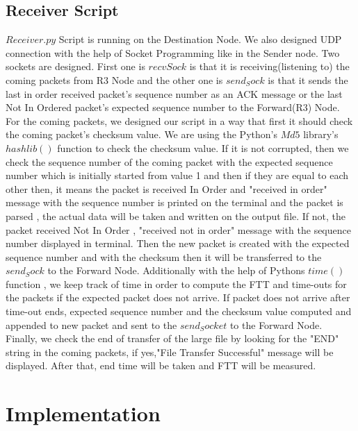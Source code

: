 \documentclass[conference]{IEEEtran}
\begin{document}
\subsection{Receiver Script}\label{CC}
$Receiver.py$ Script is running on the Destination Node. We also designed UDP connection with the help of Socket Programming like in the Sender node. Two sockets are designed. First one is $recvSock$ is that it is receiving(listening to) the coming packets from R3 Node and the other one is $send_Sock$ is that it sends the last in order received packet's sequence number as an ACK message or the last Not In Ordered packet's expected sequence number to the Forward(R3) Node. For the coming packets, we designed our script in a way that first it should check the coming packet's checksum value. We are using the Python's $Md5$ library's $hashlib()$ function to check the checksum value. If it is not corrupted, then we check the sequence number of the coming packet with the expected sequence number which is initially started from value 1 and then if they are equal to each other then, it means the packet is received In Order and "received in order" message with the sequence number is printed on the terminal and the packet is parsed , the actual data will be taken and written on the output file. If not, the packet received Not In Order , "received not in order" message with the sequence number displayed in terminal. Then the new packet is created with the expected sequence number and with the checksum then it will be transferred to the $send_Sock$ to the Forward Node. Additionally with the help of Pythons $time()$ function , we keep track of time in order to compute the FTT and time-outs for the packets if the expected packet does not arrive. If packet does not arrive after time-out ends, expected sequence number and the checksum value computed and appended to new packet and sent to the $send_Socket$ to the Forward Node. Finally, we check the end of transfer of the large file by looking for the "END" string in the coming packets, if yes,"File Transfer Successful" message will be displayed. After that, end time will be taken and FTT will be measured.

\section{Implementation}
\end{document}
